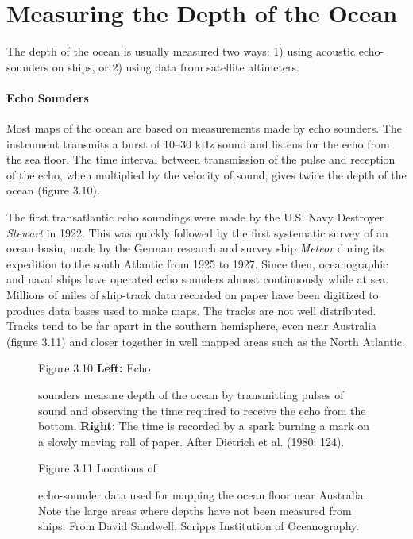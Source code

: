 \section{Measuring the Depth of the Ocean}
The depth of the ocean is usually measured two ways: 1) using acoustic
echo-sounders on ships, or 2) using data from satellite altimeters.

\paragraph{Echo Sounders} Most maps of the ocean are based
on measurements made by echo sounders. The instrument transmits a
burst of 10--30 kHz sound and
listens for the echo from the sea floor. The time interval between
transmission of the pulse and reception of the echo, when multiplied
by the velocity of sound, gives twice the depth of the ocean (figure
3.10).

The first transatlantic echo soundings were made by the U.S. Navy
Destroyer \textit{Stewart} in 1922. This was quickly followed by the
first systematic survey of an ocean basin, made by the German research
and survey ship \textit{Meteor} during its expedition to the south
Atlantic from 1925 to 1927. Since then, oceanographic and naval ships
have operated echo sounders almost continuously while at sea. Millions
of miles of ship-track data recorded on paper have been digitized to
produce data bases used to make maps.  The tracks are not well
distributed. Tracks tend to be far apart in the southern hemisphere,
even near Australia (figure 3.11) and closer together in well mapped
areas such as the North Atlantic.

\begin{figure}[t!]
\footnotesize
Figure 3.10 \textbf{Left:} Echo \rule{0ex}{5ex}sounders measure depth
of the ocean by transmitting pulses of sound and observing the time required to receive the echo
from the bottom. \textbf{Right:} The time is recorded by a spark
burning a mark on a slowly moving roll of paper. After Dietrich et
al. (1980: 124).
\label{fig:Sonar}
\vspace{-3ex}
\end{figure}

\begin{figure}[t!]
\footnotesize
Figure 3.11 Locations of \rule{0pt}{5ex}echo-sounder data used for
mapping the ocean floor near Australia. Note the large areas where
depths have not been measured from ships. From David Sandwell, Scripps
Institution of Oceanography.

\label{fig:shiptracks10}
\vspace{-3ex}
\end{figure}

